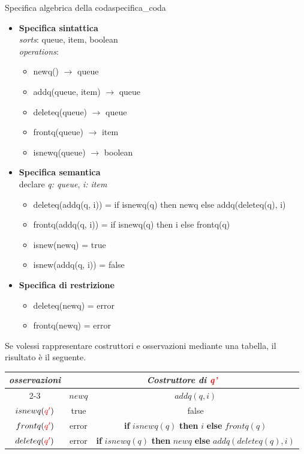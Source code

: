 \documentclass[12pt]{report}
\newcommand{\nmu}{}
\renewcommand{\arraystretch}{2}
\begin{document}
 	\begin{example}{\nmu Specifica algebrica della coda}{specifica_coda}
 		\begin{itemize}
 			\item \textbf{Specifica sintattica} \\
 			\quad \textit{sorts}: queue, item, boolean \\
 			\quad \textit{operations}:
 			\begin{itemize}
 				\item newq() $\to$ queue
 				\item addq(queue, item) $\to$ queue
 				\item deleteq(queue) $\to$ queue
 				\item frontq(queue) $\to$ item
 				\item isnewq(queue) $\to$ boolean
 			\end{itemize}
 			\item \textbf{Specifica semantica} \\
 			\quad declare \textit{q: queue}, \textit{i: item}
 			\begin{itemize}
 				\item deleteq(addq(q, i)) = if isnewq(q) then newq else addq(deleteq(q), i)
 				\item frontq(addq(q, i)) = if isnewq(q) then i else frontq(q)
 				\item isnew(newq) = true
 				\item isnew(addq(q, i)) = false
 			\end{itemize}
 			\item \textbf{Specifica di restrizione}
 			\begin{itemize}
 				\item deleteq(newq) = error
 				\item frontq(newq) = error
 			\end{itemize}
 		\end{itemize}
 		Se volessi rappresentare costruttori e osservazioni mediante una tabella, il risultato è il seguente.
 		\begin{center}
 			\renewcommand{\arraystretch}{1.5} %
 			\begin{tabular}{|c|c|c|}
 				\hline
 				\textbf{\textit{osservazioni}} & \multicolumn{2}{c|}{\textbf{\textit{Costruttore di \textcolor{red}{q'}}}} \\
 				\cline{2-3}
 				& $newq$ & $addq(q, i)$ \\
 				\hline
 				$isnewq(\textcolor{red}{q'})$ & true & false \\
 				\hline
 				$frontq(\textcolor{red}{q'})$ & error & \textbf{if} $isnewq(q)$ \textbf{then} $i$ \textbf{else} $frontq(q)$ \\
 				\hline
 				$deleteq(\textcolor{red}{q'})$ & error & \textbf{if} $isnewq(q)$ \textbf{then} $newq$ \textbf{else} $addq(deleteq(q), i)$ \\
 				\hline
 			\end{tabular}
 		\end{center}
 	\end{example}
\end{document}
